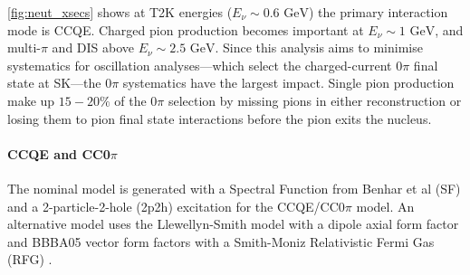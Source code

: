 \autoref{fig:neut_xsecs} shows at T2K energies ($E_\nu\sim0.6\text{ GeV}$) the primary interaction mode is CCQE. Charged pion production becomes important at $E_\nu\sim1\text{ GeV}$, and multi-$\pi$ and DIS above $E_\nu\sim2.5\text{ GeV}$. Since this analysis aims to minimise systematics for oscillation analyses---which select the charged-current 0$\pi$ final state at SK---the 0$\pi$ systematics have the largest impact. Single pion production make up $15-20\%$ of the 0$\pi$ selection by missing pions in either reconstruction or losing them to pion final state interactions before the pion exits the nucleus.


\paragraph{CCQE and CC0$\pi$}
The nominal model is generated with a Spectral Function from Benhar et al (SF) \cite{benhar} and a 2-particle-2-hole (2p2h) excitation \cite{nieves1,nieves2} for the CCQE/CC0$\pi$ model. An alternative model uses the Llewellyn-Smith model\cite{llewelyn-smith} with a dipole axial form factor and BBBA05 vector form factors \cite{bbba05} with a Smith-Moniz Relativistic Fermi Gas (RFG) \cite{Smith-Moniz}. 

